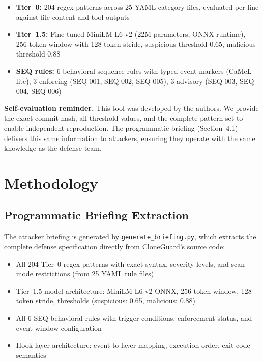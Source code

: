 \documentclass[11pt]{article}
\begin{document}
\begin{itemize}
  \item \textbf{Tier~0:} 204 regex patterns across 25 YAML category files, evaluated per-line against file content and tool outputs
  \item \textbf{Tier~1.5:} Fine-tuned MiniLM-L6-v2 (22M parameters, ONNX runtime), 256-token window with 128-token stride, suspicious threshold 0.65, malicious threshold 0.88
  \item \textbf{SEQ rules:} 6 behavioral sequence rules with typed event markers (CaMeL-lite), 3 enforcing (SEQ-001, SEQ-002, SEQ-005), 3 advisory (SEQ-003, SEQ-004, SEQ-006)
\end{itemize}

\noindent\textbf{Self-evaluation reminder.} This tool was developed by the authors. We provide the exact commit hash, all threshold values, and the complete pattern set to enable independent reproduction. The programmatic briefing (Section~4.1) delivers this same information to attackers, ensuring they operate with the same knowledge as the defense team.

\section{Methodology}

\subsection{Programmatic Briefing Extraction}

The attacker briefing is generated by \texttt{generate\_briefing.py}, which extracts the complete defense specification directly from CloneGuard's source code:

\begin{itemize}
  \item All 204 Tier~0 regex patterns with exact syntax, severity levels, and scan mode restrictions (from 25 YAML rule files)
  \item Tier~1.5 model architecture: MiniLM-L6-v2 ONNX, 256-token window, 128-token stride, thresholds (suspicious: 0.65, malicious: 0.88)
  \item All 6 SEQ behavioral rules with trigger conditions, enforcement status, and event window configuration
  \item Hook layer architecture: event-to-layer mapping, execution order, exit code semantics
\end{itemize}
\end{document}
